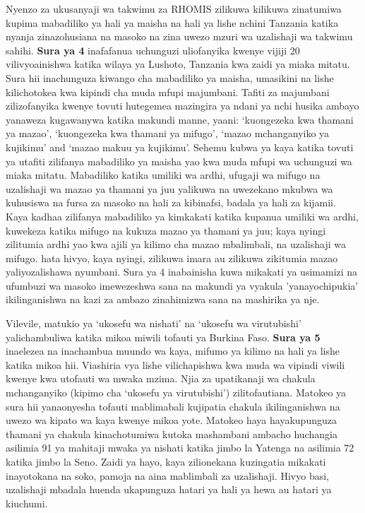 Nyenzo za ukusanyaji wa takwimu za RHOMIS zilikuwa kilikuwa zinatumiwa kupima mabadiliko ya hali ya maisha na hali ya lishe nchini Tanzania katika nyanja zinazohusiana na masoko na zina uwezo mzuri wa uzalishaji wa takwimu sahihi. \textbf{Sura ya 4} inafafanua uchunguzi uliofanyika kwenye vijiji 20 vilivyoainishwa katika wilaya ya Lushoto, Tanzania kwa zaidi ya miaka mitatu.
Sura hii inachunguza kiwango cha mabadiliko ya maisha, umasikini na lishe kilichotokea kwa kipindi cha muda mfupi majumbani. Tafiti za majumbani zilizofanyika kwenye tovuti hutegemea mazingira ya ndani ya nchi husika ambayo yanaweza kugawanywa katika makundi manne, yaani: `kuongezeka kwa thamani ya mazao', `kuongezeka kwa thamani ya mifugo', `mazao mchanganyiko ya kujikimu' and `mazao makuu ya kujikimu'. Sehemu kubwa ya kaya katika tovuti ya utafiti zilifanya mabadiliko ya maisha yao kwa muda mfupi wa uchunguzi wa miaka mitatu.
Mabadiliko katika umiliki wa ardhi, ufugaji wa mifugo na uzalishaji wa mazao ya thamani ya juu yalikuwa na uwezekano mkubwa wa kuhusiswa na fursa za masoko na hali za kibinafsi, badala ya hali za kijamii. Kaya kadhaa zilifanya mabadiliko ya kimkakati katika kupanua umiliki wa ardhi, kuwekeza katika mifugo na kukuza mazao ya thamani ya juu; kaya nyingi zilitumia ardhi yao kwa ajili ya kilimo cha mazao mbalimbali, na uzalishaji wa mifugo. hata hivyo, kaya nyingi, zilikuwa imara au zilikuwa zikitumia mazao yaliyozalishawa nyumbani. Sura ya 4 inabainisha kuwa mikakati ya usimamizi na ufumbuzi wa masoko imewezeshwa sana na makundi ya vyakula 'yanayochipukia' ikilinganishwa na kazi za ambazo zinahimizwa sana na mashirika ya nje. 

Vilevile, matukio ya `ukosefu wa nishati' na `ukosefu wa virutubishi' yalichambuliwa katika mikoa miwili tofauti ya Burkina Faso. \textbf{Sura ya 5} inaelezea na inachambua muundo wa kaya, mifumo ya kilimo na hali ya lishe katika mikoa hii. Viashiria vya lishe vilichapishwa kwa muda wa vipindi viwili kwenye kwa utofauti wa mwaka mzima. Njia za upatikanaji wa chakula mchanganyiko (kipimo cha `ukosefu ya virutubishi') zilitofautiana. Matokeo ya sura hii yanaonyesha tofauti mablimabali kujipatia chakula ikilinganishwa na uwezo wa kipato wa kaya kwenye mikoa yote. Matokeo haya hayakupunguza thamani ya chakula kinachotumiwa kutoka mashambani ambacho huchangia asilimia 91 ya mahitaji mwaka ya nishati katika jimbo la Yatenga na asilimia 72 katika jimbo la Seno. Zaidi ya hayo, kaya zilionekana kuzingatia mikakati inayotokana na soko, pamoja na aina mablimbali za uzalishaji. Hivyo basi, uzalishaji mbadala huenda ukapunguza hatari ya hali ya hewa au hatari ya kiuchumi.

